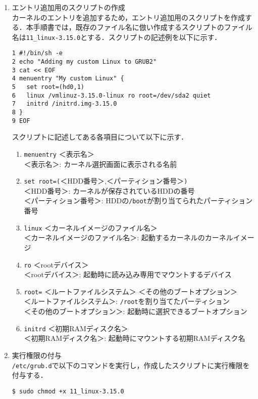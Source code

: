 \documentclass[12pt]{jsarticle}
\begin{document}
\begin{enumerate}
  \begin{enumerate}
  \item エントリ追加用のスクリプトの作成\\
    カーネルのエントリを追加するため，エントリ追加用のスクリプトを作成する．本手順書では，既存のファイル名に倣い作成するスクリプトのファイル名は\verb|11_linux-3.15.0|とする．スクリプトの記述例を以下に示す．
\begin{verbatim}
1 #!/bin/sh -e
2 echo "Adding my custom Linux to GRUB2"
3 cat << EOF
4 menuentry "My custom Linux" {
5   set root=(hd0,1)
6   linux /vmlinuz-3.15.0-linux ro root=/dev/sda2 quiet
7   initrd /initrd.img-3.15.0
8 }
9 EOF
\end{verbatim}

\newpage
スクリプトに記述してある各項目について以下に示す．
    \begin{enumerate}
    \item \verb|menuentry| ＜表示名＞ \\
      ＜表示名＞: カーネル選択画面に表示される名前
    \item \verb|set root=(|＜HDD番号＞,＜パーティション番号＞\verb|)| \\
      ＜HDD番号＞: カーネルが保存されているHDDの番号 \\
      ＜パーティション番号＞: HDDの\verb|/boot|が割り当てられたパーティション番号
    \item \verb|linux| ＜カーネルイメージのファイル名＞ \\
      ＜カーネルイメージのファイル名＞: 起動するカーネルのカーネルイメージ
    \item \verb|ro| ＜rootデバイス＞\\
      ＜rootデバイス＞: 起動時に読み込み専用でマウントするデバイス
    \item \verb|root=| ＜ルートファイルシステム＞ ＜その他のブートオプション＞\\
      ＜ルートファイルシステム＞: \verb|/root|を割り当てたパーティション \\
      ＜その他のブートオプション＞: 起動時に選択できるブートオプション
    \item \verb|initrd| ＜初期RAMディスク名＞ \\
      ＜初期RAMディスク名＞: 起動時にマウントする初期RAMディスク名
    \end{enumerate}
    
  \item 実行権限の付与\\
    \verb|/etc/grub.d|で以下のコマンドを実行し，作成したスクリプトに実行権限を付与する．
\begin{verbatim}
$ sudo chmod +x 11_linux-3.15.0
\end{verbatim}


\end{enumerate}
\end{enumerate}
\end{document}
